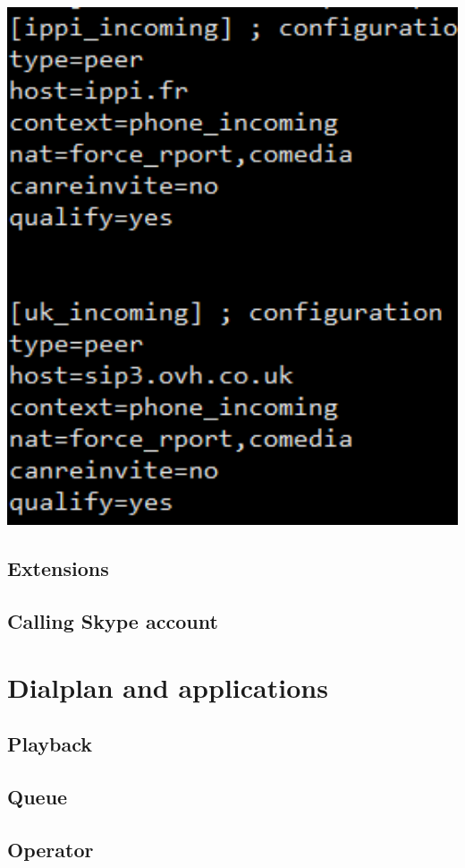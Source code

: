 \includegraphics[width=1\textwidth]{img/contextsphones.png}

\subsection{Extensions}


\subsection{Calling Skype account}


\section{Dialplan and applications}

\subsection{Playback}
\subsection{Queue}
\subsection{Operator}
